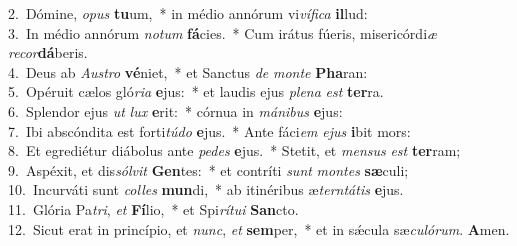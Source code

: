 {2.~}Dómine, \textit{o}\textit{pus} \textbf{tu}um,~* in médio annórum vi\textit{ví}\textit{fi}\textit{ca} \textbf{il}lud:\\
{3.~}In médio annórum \textit{no}\textit{tum} \textbf{fá}cies.~* Cum irátus fúeris, misericórdi\textit{æ} \textit{re}\textit{cor}\textbf{dá}beris.\\
{4.~}Deus ab \textit{Au}\textit{stro} \textbf{vé}niet,~* et Sanctus \textit{de} \textit{mon}\textit{te} \textbf{Pha}ran:\\
{5.~}Opéruit cælos gló\textit{ri}\textit{a} \textbf{e}jus:~* et laudis ejus \textit{ple}\textit{na} \textit{est} \textbf{ter}ra.\\
{6.~}Splendor ejus \textit{ut} \textit{lux} \textbf{e}rit:~* córnua in \textit{má}\textit{ni}\textit{bus} \textbf{e}jus:\\
{7.~}Ibi abscóndita est forti\textit{tú}\textit{do} \textbf{e}jus.~* Ante fáci\textit{em} \textit{e}\textit{jus} \textbf{i}bit mors:\\
{8.~}Et egrediétur diábolus ante \textit{pe}\textit{des} \textbf{e}jus.~* Stetit, et \textit{men}\textit{sus} \textit{est} \textbf{ter}ram;\\
{9.~}Aspéxit, et dis\textit{sól}\textit{vit} \textbf{Gen}tes:~* et contríti \textit{sunt} \textit{mon}\textit{tes} \textbf{sæ}culi;\\
{10.~}Incurváti sunt \textit{col}\textit{les} \textbf{mun}di,~* ab itinéribus æ\textit{ter}\textit{ntá}\textit{tis} \textbf{e}jus.\\
{11.~}Glória Pa\textit{tri}, \textit{et} \textbf{Fí}lio,~* et Spi\textit{rí}\textit{tu}\textit{i} \textbf{San}cto.\\
{12.~}Sicut erat in princípio, et \textit{nunc}, \textit{et} \textbf{sem}per,~* et in sǽcula sæ\textit{cu}\textit{ló}\textit{rum}. \textbf{A}men.\\
